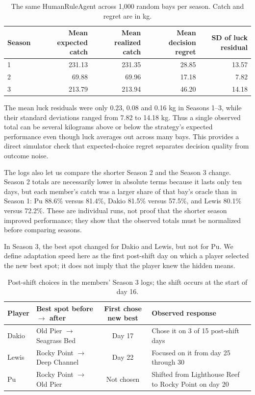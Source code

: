 \documentclass[11pt,a4paper]{article}
\begin{document}
\begin{table}[H]\centering\small
\begin{tabular}{lrrrr}\toprule
Season & Mean expected catch & Mean realized catch & Mean decision regret & SD of luck residual\\\midrule
1 & 231.13 & 231.35 & 28.85 & 13.57\\
2 & 69.88 & 69.96 & 17.18 & 7.82\\
3 & 213.79 & 213.94 & 46.20 & 14.18\\\bottomrule
\end{tabular}
\caption{The same HumanRuleAgent across 1,000 random bays per season. Catch and regret are in kg.}
\end{table}

The mean luck residuals were only 0.23, 0.08 and 0.16 kg in Seasons 1--3, while their standard deviations ranged from 7.82 to 14.18 kg. Thus a single observed total can be several kilograms above or below the strategy's expected performance even though luck averages out across many bays. This provides a direct simulator check that expected-choice regret separates decision quality from outcome noise.

The logs also let us compare the shorter Season 2 and the Season 3 change. Season 2 totals are necessarily lower in absolute terms because it lasts only ten days, but each member's catch was a larger share of that bay's oracle than in Season 1: Pu 88.6\% versus 81.4\%, Dakio 81.5\% versus 57.5\%, and Lewis 80.1\% versus 72.2\%. These are individual runs, not proof that the shorter season improved performance; they show that the observed totals must be normalized before comparing seasons.

In Season 3, the best spot changed for Dakio and Lewis, but not for Pu. We define adaptation speed here as the first post-shift day on which a player selected the new best spot; it does not imply that the player knew the hidden means.

\begin{table}[H]\centering\small
\begin{tabularx}{\textwidth}{@{}l l c X@{}}\toprule
Player & Best spot before $\to$ after & First chose new best & Observed response\\\midrule
Dakio & Old Pier $\to$ Seagrass Bed & Day 17 & Chose it on 3 of 15 post-shift days\\
Lewis & Rocky Point $\to$ Deep Channel & Day 22 & Focused on it from day 25 through 30\\
Pu & Rocky Point $\to$ Old Pier & Not chosen & Shifted from Lighthouse Reef to Rocky Point on day 20\\\bottomrule
\end{tabularx}
\caption{Post-shift choices in the members' Season 3 logs; the shift occurs at the start of day 16.}
\end{table}
\end{document}
